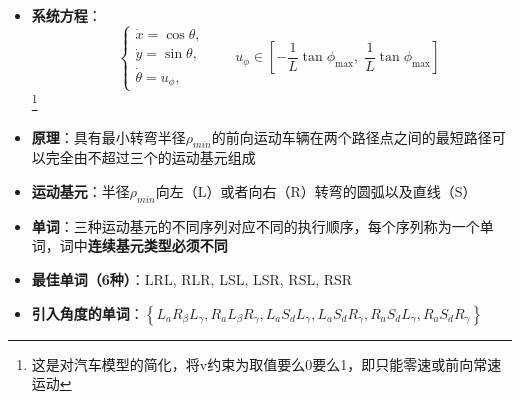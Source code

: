 \documentclass[../main.tex]{subfiles}
\begin{document}
\begin{enumerate}
\begin{itemize}
\begin{enumerate}
                        \begin{itemize}
                            \item \textbf{系统方程}：
                            \[
                            \text{} \quad
                            \begin{cases}
                            \dot{x} = \cos\theta, \\[4pt]
                            \dot{y} = \sin\theta, \\[4pt]
                            \dot{\theta} = u_{\phi},
                            \end{cases}
                            \qquad
                            u_{\phi} \in \left[-\dfrac{1}{L}\tan\phi_{\max},\; \dfrac{1}{L}\tan\phi_{\max}\right]
                            \]\footnote{这是对汽车模型的简化，将v约束为取值要么0要么1，即只能零速或前向常速运动}
                            \item \textbf{原理}：具有最小转弯半径$\rho_{min}$的前向运动车辆在两个路径点之间的最短路径可以完全由不超过三个的运动基元组成
                            \item \textbf{运动基元}：半径$\rho_{min}$向左（L）或者向右（R）转弯的圆弧以及直线（S）
                            \item \textbf{单词}：三种运动基元的不同序列对应不同的执行顺序，每个序列称为一个单词，词中\textbf{连续基元类型必须不同}
                            \item \textbf{最佳单词（6种）}：LRL, RLR, LSL, LSR, RSL, RSR
                            \item \textbf{引入角度的单词}：\( \left\{  {{L}_{a}{R}_{\beta }{L}_{\gamma },{R}_{a}{L}_{\beta }{R}_{\gamma },{L}_{a}{S}_{d}{L}_{\gamma },{L}_{a}{S}_{d}{R}_{\gamma },{R}_{a}{S}_{d}{L}_{\gamma },{R}_{a}{S}_{d}{R}_{\gamma }}\right\} \)
                            

\end{itemize}
\end{enumerate}
\end{itemize}
\end{enumerate}
\end{document}
